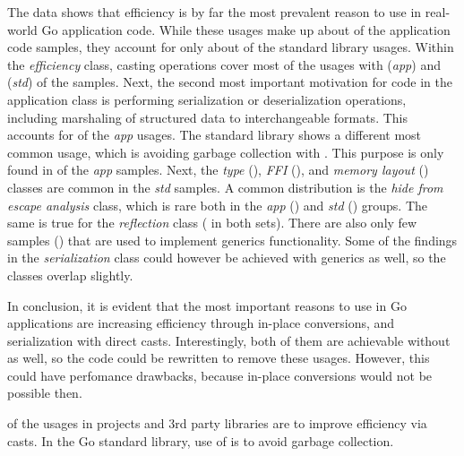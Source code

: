 

The data shows that efficiency is by far the most prevalent reason to use \unsafe{} in real-world Go application code.
While these usages make up about  of the application code samples, they account for only about
 of the standard library usages.
Within the \textit{efficiency} class, casting operations cover most of the usages with  (\textit{app})
and  (\textit{std}) of the samples.
Next, the second most important motivation for \unsafe{} code in the application class is performing serialization or
deserialization operations, including marshaling of structured data to interchangeable formats.
This accounts for  of the \textit{app} usages.
The standard library shows a different most common usage, which is avoiding garbage collection with .
This purpose is only found in  of the \textit{app} samples.
Next, the \textit{type} (), \textit{\acrshort{FFI}} (), and \textit{memory layout}
() classes are common in the \textit{std} samples.
A common distribution is the \textit{hide from escape analysis} class, which is rare both in the \textit{app}
() and \textit{std} () groups.
The same is true for the \textit{reflection} class ( in both sets).
There are also only few samples () that are used to implement generics functionality.
Some of the findings in the \textit{serialization} class could however be achieved with generics as well, so the classes
overlap slightly.

In conclusion, it is evident that the most important reasons to use \unsafe{} in Go applications are increasing
efficiency through in-place conversions, and serialization with direct casts.
Interestingly, both of them are achievable without \unsafe{} as well, so the code could be rewritten to remove these
usages.
However, this could have perfomance drawbacks, because in-place conversions would not be possible then.

\begin{answerToRQ}[\ref{rq:purpose}]
     of the \unsafe{} usages in projects and 3rd party libraries are to improve efficiency via
    \unsafe{} casts.
    In the Go standard library,  use of \unsafe{} is to avoid garbage collection.
\end{answerToRQ}



